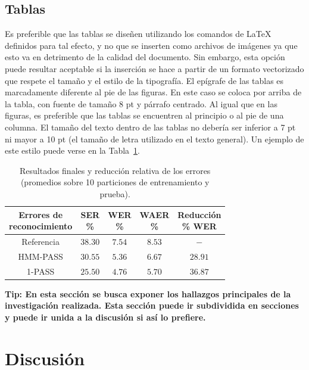 \documentclass{sophicart}
\begin{document}
\subsection{Tablas}
Es preferible que las tablas se diseñen utilizando los comandos de \LaTeX\xspace definidos para tal efecto,
y no que se inserten como archivos de imágenes ya que esto va en detrimento de la calidad del
documento. Sin embargo, esta opción puede resultar aceptable si la inserción se hace a partir de un
formato vectorizado que respete el tamaño y el estilo de la tipografía.
El epígrafe de las tablas es marcadamente diferente al pie de las figuras. En este caso se coloca por
arriba de la tabla, con fuente de tamaño 8 pt y párrafo centrado.
Al igual que en las figuras, es preferible que las tablas se encuentren al principio o al pie de una
columna. El tamaño del texto dentro de las tablas no debería ser inferior a 7 pt ni mayor a 10 pt (el
tamaño de letra utilizado en el texto general).
Un ejemplo de este estilo puede verse en la Tabla~\ref{tabla-1}.

\begin{table}[!b]
 \centering
  \caption{Resultados finales y reducción relativa de los errores (promedios sobre 10 particiones de
 entrenamiento y prueba).} \label{tabla-1}
 {\small
 \begin{tabular}{ccccc}
  \hline
  \hline
  \thead{Errores de \\ reconocimiento} & \thead{SER \\ \%} & \thead{WER \\ \%} & \thead{WAER \\ \%} &
                        \thead{Reducción \\ \% WER} \\
  \hline
  \hline
  Referencia & $38.30$ & $7.54$ & $8.53$ & $-$ \\
  \hline
  HMM-PASS & $30.55$ & $5.36$ & $6.67$ & $28.91$ \\
  1-PASS & $25.50$ & $4.76$ & $5.70$ & $36.87$   \\
  \hline
  \hline
 \end{tabular}}
\end{table}

\textbf{Tip: En esta sección se busca exponer los hallazgos principales de la investigación realizada. Esta sección puede ir subdividida en secciones y puede ir unida a la discusión si así lo prefiere.} 

\section{Discusión}
\end{document}
